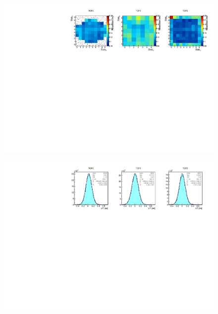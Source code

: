 \begin{figure}
  \begin{center}
  \includegraphics[width=15cm]{06_slab_dt_resolution_by_pixel_2d} \\
  \caption{}
  \label{fig:SlabDTresByPixel}
  \end{center}
\end{figure}



\begin{figure}
  \begin{center}
  \includegraphics[width=15cm]{07_overall_slab_dt} \\
  \caption{}
  \label{fig:SlabDtAll}
  \end{center}
\end{figure}



